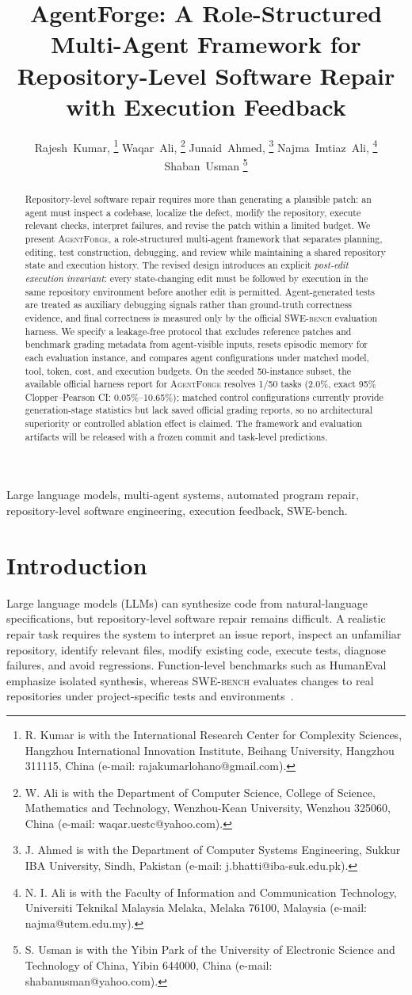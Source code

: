 \documentclass[journal]{IEEEtran}
\title{AgentForge: A Role-Structured Multi-Agent Framework for Repository-Level Software Repair with Execution Feedback}
\author{%
Rajesh~Kumar,
\thanks{R. Kumar is with the International Research Center for Complexity Sciences, Hangzhou International Innovation Institute, Beihang University, Hangzhou 311115, China (e-mail: rajakumarlohano@gmail.com).}
Waqar~Ali,
\thanks{W. Ali is with the Department of Computer Science, College of Science, Mathematics and Technology, Wenzhou-Kean University, Wenzhou 325060, China (e-mail: waqar.uestc@yahoo.com).}
Junaid~Ahmed,
\thanks{J. Ahmed is with the Department of Computer Systems Engineering, Sukkur IBA University, Sindh, Pakistan (e-mail: j.bhatti@iba-suk.edu.pk).}
Najma~Imtiaz~Ali,
\thanks{N. I. Ali is with the Faculty of Information and Communication Technology, Universiti Teknikal Malaysia Melaka, Melaka 76100, Malaysia (e-mail: najma@utem.edu.my).}
Shaban~Usman%
\thanks{S. Usman is with the Yibin Park of the University of Electronic Science and Technology of China, Yibin 644000, China (e-mail: shabanusman@yahoo.com).}}
\newcommand{\agentforge}{\textsc{AgentForge}}
\newcommand{\swebench}{\textsc{SWE-bench}}
\begin{document}
\maketitle

\begin{abstract}
Repository-level software repair requires more than generating a plausible patch: an agent must inspect a codebase, localize the defect, modify the repository, execute relevant checks, interpret failures, and revise the patch within a limited budget. We present \agentforge{}, a role-structured multi-agent framework that separates planning, editing, test construction, debugging, and review while maintaining a shared repository state and execution history. The revised design introduces an explicit \emph{post-edit execution invariant}: every state-changing edit must be followed by execution in the same repository environment before another edit is permitted. Agent-generated tests are treated as auxiliary debugging signals rather than ground-truth correctness evidence, and final correctness is measured only by the official \swebench{} evaluation harness. We specify a leakage-free protocol that excludes reference patches and benchmark grading metadata from agent-visible inputs, resets episodic memory for each evaluation instance, and compares agent configurations under matched model, tool, token, cost, and execution budgets. On the seeded 50-instance subset, the available official harness report for \agentforge{} resolves 1/50 tasks (2.0\%, exact 95\% Clopper--Pearson CI: 0.05\%--10.65\%); matched control configurations currently provide generation-stage statistics but lack saved official grading reports, so no architectural superiority or controlled ablation effect is claimed. The framework and evaluation artifacts will be released with a frozen commit and task-level predictions.
\end{abstract}

\begin{IEEEkeywords}
Large language models, multi-agent systems, automated program repair, repository-level software engineering, execution feedback, SWE-bench.
\end{IEEEkeywords}

\section{Introduction}
\label{sec:intro}

Large language models (LLMs) can synthesize code from natural-language specifications, but repository-level software repair remains difficult. A realistic repair task requires the system to interpret an issue report, inspect an unfamiliar repository, identify relevant files, modify existing code, execute tests, diagnose failures, and avoid regressions. Function-level benchmarks such as HumanEval emphasize isolated synthesis, whereas \swebench{} evaluates changes to real repositories under project-specific tests and environments~\cite{chen2021codex,jimenez2024swebench}.
\end{document}
